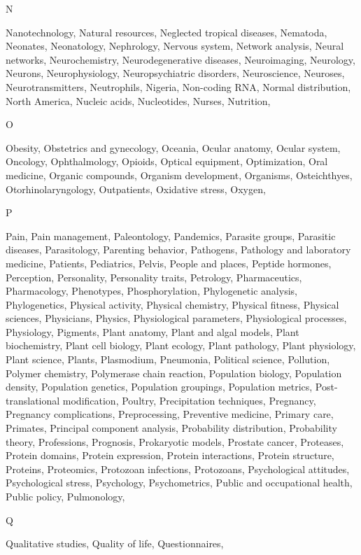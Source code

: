 N

Nanotechnology, Natural resources, Neglected tropical diseases, Nematoda, Neonates, Neonatology, Nephrology, Nervous system, Network analysis, Neural networks, Neurochemistry, Neurodegenerative diseases, Neuroimaging, Neurology, Neurons, Neurophysiology, Neuropsychiatric disorders, Neuroscience, Neuroses, Neurotransmitters, Neutrophils, Nigeria, Non-coding RNA, Normal distribution, North America, Nucleic acids, Nucleotides, Nurses, Nutrition, 

O

Obesity, Obstetrics and gynecology, Oceania, Ocular anatomy, Ocular system, Oncology, Ophthalmology, Opioids, Optical equipment, Optimization, Oral medicine, Organic compounds, Organism development, Organisms, Osteichthyes, Otorhinolaryngology, Outpatients, Oxidative stress, Oxygen, 

P

Pain, Pain management, Paleontology, Pandemics, Parasite groups, Parasitic diseases, Parasitology, Parenting behavior, Pathogens, Pathology and laboratory medicine, Patients, Pediatrics, Pelvis, People and places, Peptide hormones, Perception, Personality, Personality traits, Petrology, Pharmaceutics, Pharmacology, Phenotypes, Phosphorylation, Phylogenetic analysis, Phylogenetics, Physical activity, Physical chemistry, Physical fitness, Physical sciences, Physicians, Physics, Physiological parameters, Physiological processes, Physiology, Pigments, Plant anatomy, Plant and algal models, Plant biochemistry, Plant cell biology, Plant ecology, Plant pathology, Plant physiology, Plant science, Plants, Plasmodium, Pneumonia, Political science, Pollution, Polymer chemistry, Polymerase chain reaction, Population biology, Population density, Population genetics, Population groupings, Population metrics, Post-translational modification, Poultry, Precipitation techniques, Pregnancy, Pregnancy complications, Preprocessing, Preventive medicine, Primary care, Primates, Principal component analysis, Probability distribution, Probability theory, Professions, Prognosis, Prokaryotic models, Prostate cancer, Proteases, Protein domains, Protein expression, Protein interactions, Protein structure, Proteins, Proteomics, Protozoan infections, Protozoans, Psychological attitudes, Psychological stress, Psychology, Psychometrics, Public and occupational health, Public policy, Pulmonology, 

Q

Qualitative studies, Quality of life, Questionnaires, 

